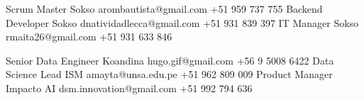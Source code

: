 %
%
%

\vspace{1em}
\begin{referees}
		 	{}
		 	{Scrum Master}
		 	{Sokso}
		 	{arombautista@gmail.com}
		 	{+51 959 737 755}
		 	{}
		 	{Backend Developer}
		 	{Sokso}
		 	{dnatividadlecca@gmail.com}
		 	{+51 931 839 397}
		 	{}
		 	{IT Manager}
		 	{Sokso}
		 	{rmaita26@gmail.com}
		 	{+51 931 633 846}
\par\bigskip
		 	{}
		 	{Senior Data Engineer}
		 	{Koandina}
		 	{hugo.gif@gmail.com}
		 	{+56 9 5008 6422}
		 	{}
		 	{Data Science Lead}
		 	{ISM}
		 	{amayta@unsa.edu.pe}
		 	{+51 962 809 009}
		 	{}
		 	{Product Manager}
		 	{Impacto AI}
		 	{dsm.innovation@gmail.com}
		 	{+51 992 794 636}
\end{referees}